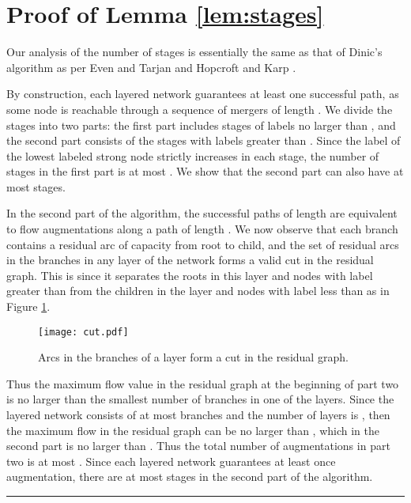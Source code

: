 \documentclass{article}
\newenvironment{proof}[1][Proof:]{\begin{trivlist}
\item[\hskip \labelsep {\bfseries #1}]}{\end{trivlist}}
\newcommand{\qed}{\hfill \rule{2.5mm}{2.5mm}}
\begin{document}
\clearpage
\newpage
\appendix

\section{Proof of Lemma \ref{lem:stages}}
\label{proof:stages}

\begin{proof}
Our analysis of the number of stages is essentially the same as that of Dinic's algorithm as per Even and Tarjan \cite{EveT75} and Hopcroft and Karp \cite{HopK73}.

By construction, each  layered network guarantees at least one successful path, as some  node is reachable through a sequence of mergers of length . We divide the stages into two parts: the first part includes stages of labels no larger than , and the second part consists of the stages with labels greater than .  Since the label of the lowest labeled strong node strictly increases in each stage, the number of stages in the first part is at most . We show that the second part can also have at most  stages.

In the second part of the algorithm, the successful paths of length  are equivalent to flow augmentations along a path of length .  We now observe that each  branch contains a residual arc of capacity  from root to child, and the set of residual arcs in the  branches in any layer  of the network forms a valid cut in the residual graph.  This is since it separates the roots in this layer and nodes with label greater than  from the children in the layer and nodes with label less than  as in Figure \ref{fig:cut}.

\begin{figure}[ht]
\centerline{\texttt{[image: cut.pdf]}}
\caption{\label{fig:cut}Arcs in the branches of a layer form a cut in the residual graph.}
\end{figure}

Thus the maximum flow value in the residual graph at the beginning of part two is no larger than the smallest number of branches in one of the layers. Since the layered network consists of at most  branches and the number of layers is , then the maximum flow in the residual graph can be no larger than , which in the second part is no larger than . Thus the total number of augmentations in part two is at most . Since each layered network guarantees at least once augmentation, there are at most  stages in the second part of the algorithm. \qed
\end{proof}
\end{document}
